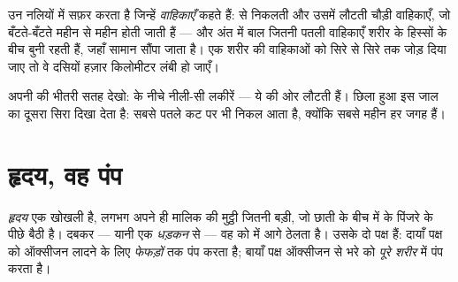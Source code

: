 \begin{definition}[रक्त वाहिकाएँ]\label{def:g4:heart-and-blood:vessels}
 उन नलियों में सफ़र करता है जिन्हें 
\emph{वाहिकाएँ} कहते हैं:  से निकलती और उसमें
लौटती चौड़ी वाहिकाएँ, जो बँटते-बँटते महीन से महीन होती जाती हैं --- और
अंत में बाल जितनी पतली वाहिकाएँ शरीर के हिस्सों के बीच बुनी रहती हैं,
जहाँ सामान सौंपा जाता है। एक शरीर की वाहिकाओं को सिरे से सिरे तक जोड़
दिया जाए तो वे दसियों हज़ार किलोमीटर लंबी हो जाएँ।
\end{definition}

\begin{remark}[वाहिकाओं को देखना]\label{rem:g4:heart-and-blood:see}
अपनी  की भीतरी सतह देखो:  के नीचे नीली-सी लकीरें --- ये 
की ओर लौटती  हैं। छिला हुआ  इस जाल का दूसरा सिरा
दिखा देता है: सबसे पतले कट पर भी  निकल आता है, क्योंकि सबसे महीन
 हर जगह हैं।
\end{remark}

\section{हृदय, वह पंप}

\begin{definition}[हृदय]\label{def:g4:heart-and-blood:heart}
\emph{हृदय} एक खोखली  है, लगभग अपने ही मालिक की मुट्ठी
जितनी बड़ी, जो छाती के बीच में  के पिंजरे के पीछे बैठी है। दबकर
--- यानी एक \emph{धड़कन} से --- वह  को  में
आगे ठेलता है। उसके दो पक्ष हैं: दायाँ पक्ष  को ऑक्सीजन लादने के
लिए \emph{फेफड़ों} तक पंप करता है; बायाँ पक्ष ऑक्सीजन से भरे  को
\emph{पूरे शरीर} में पंप करता है।
\end{definition}

